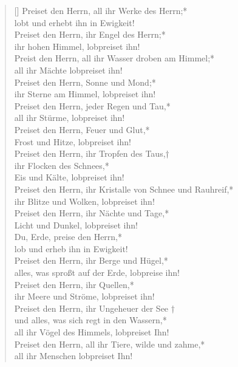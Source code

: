 \begin{verse}[\versewidth]
 Preiset den Herrn, all ihr Werke des Herrn;*\\
 lobt und erhebt ihn in Ewigkeit!\\
\vin Preiset den Herrn, ihr Engel des Herrn;*\\
\vin ihr hohen Himmel, lobpreiset ihn!\\
Preist den Herrn, all ihr Wasser droben am Himmel;*\\
all ihr Mächte lobpreiset ihn!\\
\vin Preiset den Herrn, Sonne und Mond;*\\
\vin ihr Sterne am Himmel, lobpreiset ihn!\\
Preiset den Herrn, jeder Regen und Tau,*\\
all ihr Stürme, lobpreiset ihn!\\
\vin Preiset den Herrn, Feuer und Glut,*\\
\vin Frost und Hitze, lobpreiset ihn!\\
Preiset den Herrn, ihr Tropfen des Taus,†\\
ihr Flocken des Schnees,*\\
Eis und Kälte, lobpreiset ihn!\\
\vin Preiset den Herrn, ihr Kristalle von Schnee und Rauhreif,*\\
\vin ihr Blitze und Wolken, lobpreiset ihn!\\
Preiset den Herrn, ihr Nächte und Tage,*\\
Licht und Dunkel, lobpreiset ihn!\\
\vin Du, Erde,  preise den Herrn,*\\
\vin lob und erheb ihn in Ewigkeit!\\
Preiset den Herrn, ihr Berge und Hügel,*\\
alles, was sproßt auf der Erde, lobpreise ihn!\\
\vin Preiset den Herrn, ihr Quellen,*\\
\vin ihr Meere und Ströme, lobpreiset ihn!\\
Preiset den Herrn, ihr Ungeheuer der See †\\
und alles, was sich regt in den Wassern,*\\
all ihr Vögel des Himmels, lobpreiset Ihn!\\
\vin Preiset den Herrn, all ihr Tiere, wilde und zahme,*\\
\vin all ihr Menschen lobpreiset Ihn!\\


\end{verse}
